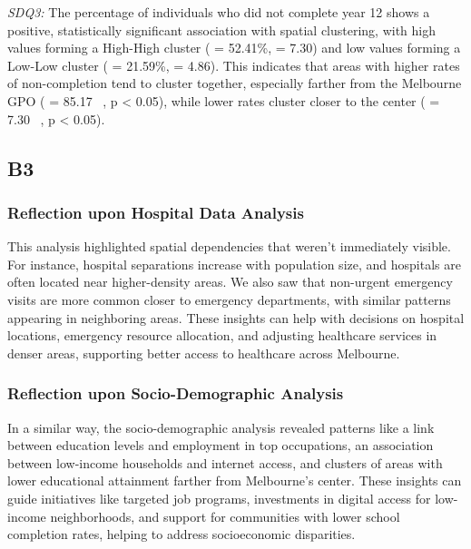 \documentclass[
	a4paper, %
	10pt, %
	unnumberedsections, %
	twoside, %
]{LTJournalArticle}
\begin{document}
\textit{SDQ3:} The percentage of individuals who did not complete year 12 shows a positive, statistically significant association with spatial clustering, with high values forming a High-High cluster ( = 52.41\%,  = 7.30) and low values forming a Low-Low cluster ( = 21.59\%,  = 4.86). This indicates that areas with higher rates of non-completion tend to cluster together, especially farther from the Melbourne GPO ( = 85.17 \ , p < 0.05), while lower rates cluster closer to the center ( = 7.30 \ , p < 0.05).



\subsection{B3}

\subsubsection{Reflection upon Hospital Data Analysis} \leavevmode
 
This analysis highlighted spatial dependencies that weren’t immediately visible. For instance, hospital separations increase with population size, and hospitals are often located near higher-density areas. We also saw that non-urgent emergency visits are more common closer to emergency departments, with similar patterns appearing in neighboring areas. These insights can help with decisions on hospital locations, emergency resource allocation, and adjusting healthcare services in denser areas, supporting better access to healthcare across Melbourne.

\subsubsection{Reflection upon Socio-Demographic Analysis}\leavevmode

In a similar way, the socio-demographic analysis revealed patterns like a link between education levels and employment in top occupations, an association between low-income households and internet access, and clusters of areas with lower educational attainment farther from Melbourne's center. These insights can guide initiatives like targeted job programs, investments in digital access for low-income neighborhoods, and support for communities with lower school completion rates, helping to address socioeconomic disparities.
\end{document}

